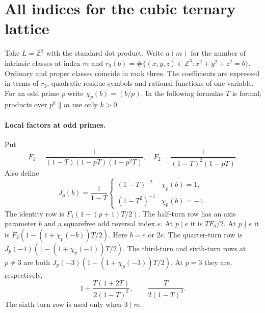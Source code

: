\section{All indices for the cubic ternary lattice}\label{sec:cubic}
Take $L=\mathbb Z^3$ with the standard dot product. Write
$a(m)$ for the number of intrinsic classes at index $m$ and
$r_3(b)=\#\{(x,y,z)\in\mathbb Z^3:x^2+y^2+z^2=b\}$.
Ordinary and proper classes coincide in rank three. The coefficients
are expressed in terms of $r_3$, quadratic residue symbols and rational
functions of one variable.
For an odd prime $p$ write $\chi_p(b)=(b/p)$. In the following formulas
$T$ is formal; products over $p^k\parallel m$ use only $k>0$.

\paragraph{Local factors at odd primes.}
Put
\[
 F_1=\frac1{(1-T)(1-pT)(1-p^2T)},\quad
 F_2=\frac1{(1-T)^2(1-pT)}.
\]
Also define
\[
 J_p(b)=\frac1{1-T}
 \begin{cases}(1-T)^{-2}&\chi_p(b)=1,\\
 (1-T^2)^{-1}&\chi_p(b)=-1.\end{cases}
\]
The identity row is $F_1(1-(p+1)T/2)$. The half-turn row has an
axis parameter $b$ and a squarefree odd reversal index $e$. At $p\mid e$
it is $TF_2/2$. At $p\nmid e$ it is
$F_2(1-(1+\chi_p(-b))T/2)$. Here $b=e$ or $2e$.
The quarter-turn row is $J_p(-1)(1-(1+\chi_p(-1))T/2)$.
The third-turn and sixth-turn rows at $p\ne3$ are both
$J_p(-3)(1-(1+\chi_p(-3))T/2)$. At $p=3$ they are, respectively,
\[
 1+\frac{T(1+2T)}{2(1-T)^2},\qquad \frac{T}{2(1-T)^2}.
\]
The sixth-turn row is used only when $3\mid m$.

